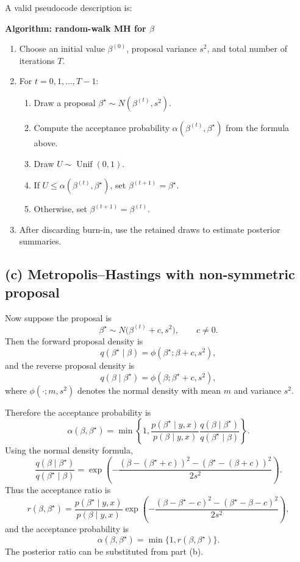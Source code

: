 \documentclass[11pt]{article}
\begin{document}
A valid pseudocode description is:

\textbf{Algorithm: random-walk MH for $\beta$}
\begin{enumerate}[label=\arabic*.]
\item Choose an initial value $\beta^{(0)}$, proposal variance $s^2$, and total number of iterations $T$.
\item For $t=0,1,\dots,T-1$:
\begin{enumerate}[label=(\alph*)]
\item Draw a proposal $\beta^\star\sim N(\beta^{(t)},s^2)$.
\item Compute the acceptance probability $\alpha(\beta^{(t)},\beta^\star)$ from the formula above.
\item Draw $U\sim \operatorname{Unif}(0,1)$.
\item If $U\le \alpha(\beta^{(t)},\beta^\star)$, set $\beta^{(t+1)}=\beta^\star$.
\item Otherwise, set $\beta^{(t+1)}=\beta^{(t)}$.
\end{enumerate}
\item After discarding burn-in, use the retained draws to estimate posterior summaries.
\end{enumerate}

\subsection*{(c) Metropolis--Hastings with non-symmetric proposal}
Now suppose the proposal is
\[
\beta^\star\sim N\bigl(\beta^{(t)}+c,s^2\bigr),
\qquad c\neq0.
\]
Then the forward proposal density is
\[
q(\beta^\star\mid\beta)=\phi(\beta^\star;\beta+c,s^2),
\]
and the reverse proposal density is
\[
q(\beta\mid\beta^\star)=\phi(\beta;\beta^\star+c,s^2),
\]
where $\phi(\cdot;m,s^2)$ denotes the normal density with mean $m$ and variance $s^2$.

Therefore the acceptance probability is
\[
\alpha(\beta,\beta^\star)=\min\left\{1,
\frac{p(\beta^\star\mid y,x)}{p(\beta\mid y,x)}
\frac{q(\beta\mid\beta^\star)}{q(\beta^\star\mid\beta)}
\right\}.
\]
Using the normal density formula,
\[
\frac{q(\beta\mid\beta^\star)}{q(\beta^\star\mid\beta)}
=
\exp\left(
-\frac{(\beta-(\beta^\star+c))^2-(\beta^\star-(\beta+c))^2}{2s^2}
\right).
\]
Thus the acceptance ratio is
\[
r(\beta,\beta^\star)=
\frac{p(\beta^\star\mid y,x)}{p(\beta\mid y,x)}
\exp\left(
-\frac{(\beta-\beta^\star-c)^2-(\beta^\star-\beta-c)^2}{2s^2}
\right),
\]
and the acceptance probability is
\[
\alpha(\beta,\beta^\star)=\min\{1,r(\beta,\beta^\star)\}.
\]
The posterior ratio can be substituted from part (b).
\end{document}
